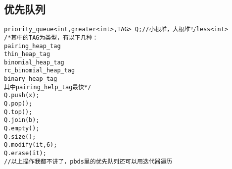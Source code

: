 \documentclass[twocolumn,a4]{article}
\begin{document}
\subsection{优先队列}
\begin{lstlisting}
priority_queue<int,greater<int>,TAG> Q;//小根堆，大根堆写less<int>
/*其中的TAG为类型，有以下几种：
pairing_heap_tag
thin_heap_tag
binomial_heap_tag
rc_binomial_heap_tag
binary_heap_tag
其中pairing_help_tag最快*/
Q.push(x);
Q.pop();
Q.top();
Q.join(b);
Q.empty();
Q.size();
Q.modify(it,6);
Q.erase(it);
//以上操作我都不讲了，pbds里的优先队列还可以用迭代器遍历
\end{lstlisting}
\end{document}
